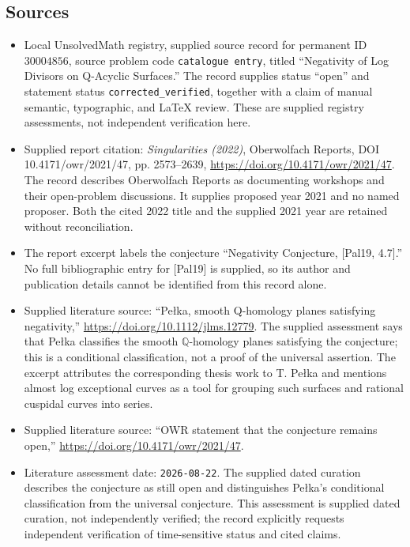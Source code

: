 \documentclass[11pt]{article}
\newcommand{\Q}{\mathbb{Q}}
\begin{document}
\subsection{Sources}
\begin{itemize}
\item Local UnsolvedMath registry, supplied source record for permanent ID \(30004856\), source problem code \texttt{catalogue entry}, titled ``Negativity of Log Divisors on Q-Acyclic Surfaces.'' The record supplies status ``open'' and statement status \texttt{corrected\_verified}, together with a claim of manual semantic, typographic, and LaTeX review. These are supplied registry assessments, not independent verification here.
\item Supplied report citation: \emph{Singularities (2022)}, Oberwolfach Reports, DOI 10.4171/owr/2021/47, pp. 2573--2639, \url{https://doi.org/10.4171/owr/2021/47}. The record describes Oberwolfach Reports as documenting workshops and their open-problem discussions. It supplies proposed year 2021 and no named proposer. Both the cited 2022 title and the supplied 2021 year are retained without reconciliation.
\item The report excerpt labels the conjecture ``Negativity Conjecture, [Pal19, 4.7].'' No full bibliographic entry for [Pal19] is supplied, so its author and publication details cannot be identified from this record alone.
\item Supplied literature source: ``Pełka, smooth Q-homology planes satisfying negativity,'' \url{https://doi.org/10.1112/jlms.12779}. The supplied assessment says that Pełka classifies the smooth \(\Q\)-homology planes satisfying the conjecture; this is a conditional classification, not a proof of the universal assertion. The excerpt attributes the corresponding thesis work to T. Pełka and mentions almost log exceptional curves as a tool for grouping such surfaces and rational cuspidal curves into series.
\item Supplied literature source: ``OWR statement that the conjecture remains open,'' \url{https://doi.org/10.4171/owr/2021/47}.
\item Literature assessment date: \texttt{2026-08-22}. The supplied dated curation describes the conjecture as still open and distinguishes Pełka's conditional classification from the universal conjecture. This assessment is supplied dated curation, not independently verified; the record explicitly requests independent verification of time-sensitive status and cited claims.
\end{itemize}
\end{document}
